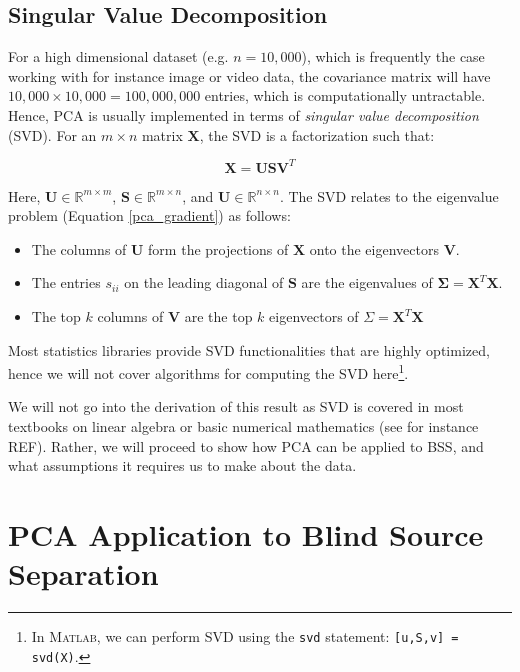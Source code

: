 \documentclass[11pt, oneside, a4paper]{report}
\begin{document}
\subsection{Singular Value Decomposition}

For a high dimensional dataset (e.g. $n = 10,000$), which is
frequently the case working with for instance image or video data, the
covariance matrix will have $10,000\times 10,000 = 100,000,000$
entries, which is computationally untractable. Hence, PCA is usually
implemented in terms of \emph{singular value decomposition} (SVD). For
an $m\times n$ matrix $\boldsymbol{X}$, the SVD is a factorization
such that:


\begin{equation}
  \boldsymbol{X} = \boldsymbol{USV}^{T}
\end{equation}


Here, $\boldsymbol{U} \in \mathbb{R}^{m\times m}$, $\boldsymbol{S} \in \mathbb{R}^{m\times n}$,
and $\boldsymbol{U} \in \mathbb{R}^{n\times n}$. The SVD relates to the eigenvalue
problem (Equation \ref{pca_gradient}) as follows:


\begin{itemize}
\item The columns of $\boldsymbol{U}$ form the projections of $\boldsymbol{X}$ onto the
  eigenvectors $\boldsymbol{V}$.
  \item The entries $s_{ii}$ on the leading diagonal of $\boldsymbol{S}$ are the
    eigenvalues of $\boldsymbol{\Sigma} = \boldsymbol{X}^T\boldsymbol{X}$.
  \item The top $k$ columns of $\boldsymbol{V}$ are the top $k$ eigenvectors of
    $\Sigma = \boldsymbol{X}^T \boldsymbol{X}$
\end{itemize}


Most statistics libraries provide SVD functionalities that are highly
optimized, hence we will not cover algorithms for computing the SVD
here\footnote{In \textsc{Matlab}, we can perform SVD using the
  \texttt{svd}
statement: \texttt{[u,S,v] = svd(X)}.}.


We will not go into the derivation of this result as SVD is covered
in most textbooks on linear algebra or basic numerical
mathematics (see for instance REF). Rather, we will proceed to show how PCA can be applied to
BSS, and what assumptions it requires us to make about the data.




\section{PCA Application to Blind Source Separation}\label{pca_bss}
\end{document}
